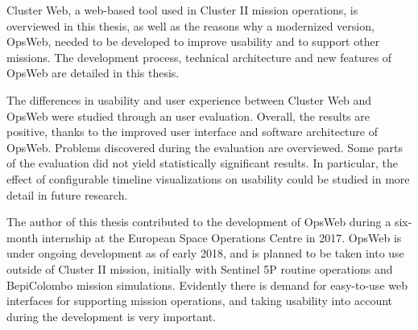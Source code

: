 
Cluster Web, a web-based tool used in Cluster II mission operations, is overviewed in this thesis, as well as the reasons why a modernized version, OpsWeb, needed to be developed to improve usability and to support other missions. The development process, technical architecture and new features of OpsWeb are detailed in this thesis. 

The differences in usability and user experience between Cluster Web and OpsWeb were studied through an user evaluation. Overall, the results are positive, thanks to the improved user interface and software architecture of OpsWeb. Problems discovered during the evaluation are overviewed. Some parts of the evaluation did not yield statistically significant results. In particular, the effect of configurable timeline visualizations on usability could be studied in more detail in future research.

The author of this thesis contributed to the development of OpsWeb during a six-month internship at the European Space Operations Centre in 2017. OpsWeb is under ongoing development as of early 2018, and is planned to be taken into use outside of Cluster II mission, initially with Sentinel 5P routine operations and BepiColombo mission simulations. Evidently there is demand for easy-to-use web interfaces for supporting mission operations, and taking usability into account during the development is very important.